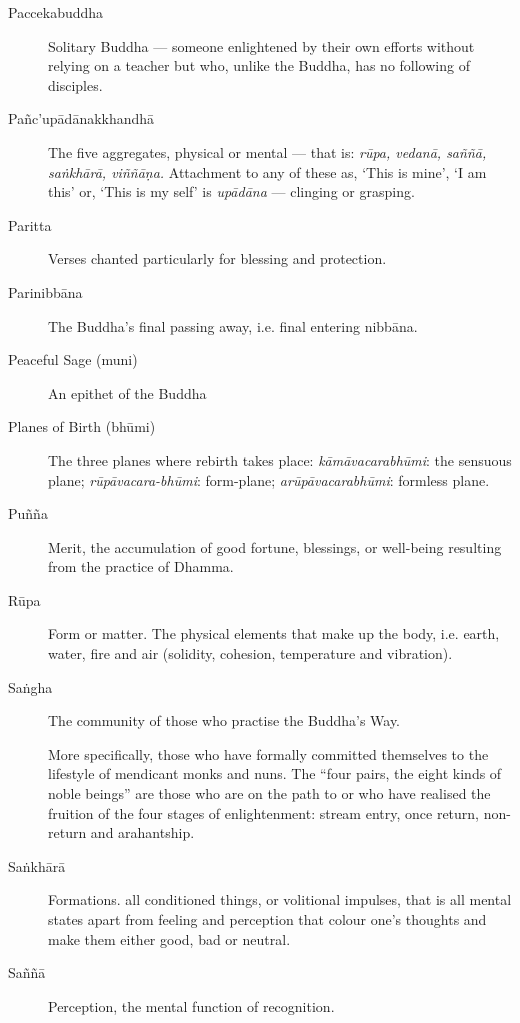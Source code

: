 \begin{description}
\item[Paccekabuddha] Solitary Buddha --- someone enlightened by their own
  efforts without relying on a teacher but who, unlike the Buddha, has
  no following of disciples.

\item[Pañc’upādānakkhandhā] The five aggregates, physical or mental ---
  that is: \emph{rūpa, vedanā, saññā, saṅkhārā, viññāṇa.} Attachment to
  any of these as, ‘This is mine’, ‘I am this’ or, ‘This is my self’ is
  \emph{upādāna} --- clinging or grasping.

\item[Paritta] Verses chanted particularly for blessing and protection.

\item[Parinibbāna] The Buddha’s final passing away, i.e. final entering
  nibbāna.

\item[Peaceful Sage (muni)] An epithet of the Buddha

\item[Planes of Birth (bhūmi)] The three planes where rebirth takes
  place: \emph{kāmāvacarabhūmi}: the sensuous plane;
  \emph{rūpāvacara-bhūmi}: form-plane; \emph{arūpāvacarabhūmi}: formless
  plane.

\item[Puñña] Merit, the accumulation of good fortune, blessings, or
  well-being resulting from the practice of Dhamma.

\item[Rūpa] Form or matter. The physical elements that make up the body,
  i.e. earth, water, fire and air (solidity, cohesion, temperature and
  vibration).

\item[Saṅgha] The community of those who practise the Buddha’s Way.

  More specifically, those who have formally committed themselves to the
lifestyle of mendicant monks and nuns. The “four pairs, the eight kinds of
noble beings” are those who are on the path to or who have realised the
fruition of the four stages of enlightenment: stream entry, once return,
non-return and arahantship.

\item[Saṅkhārā] Formations. all conditioned things, or volitional
  impulses, that is all mental states apart from feeling and perception
  that colour one’s thoughts and make them either good, bad or neutral.

\item[Saññā] Perception, the mental function of recognition.


\end{description}
